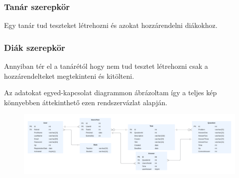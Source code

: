 \subsubsection{Tanár szerepkör}
Egy tanár tud teszteket létrehozni és azokat hozzárendelni diákokhoz.

\subsubsection{Diák szerepkör}
Annyiban tér el a tanárétól hogy nem tud tesztet létrehozni csak a hozzárendelteket megtekinteni és kitölteni.



Az adatokat egyed-kapcsolat diagrammon ábrázoltam így a teljes kép könnyebben áttekinthető ezen rendszervázlat alapján.

\begin{figure}[H]
    \centering
    \includegraphics[width=\linewidth]{images/TestME_ER.png}
\end{figure}

